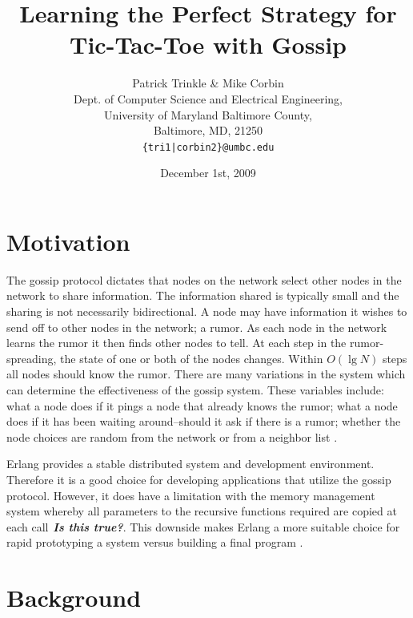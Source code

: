\documentclass[11pt,twocolumn]{article}
\title{Learning the Perfect Strategy for Tic-Tac-Toe with Gossip}
\author{Patrick Trinkle \& Mike Corbin\\
Dept. of Computer Science and Electrical Engineering,\\
University of Maryland Baltimore County,\\
Baltimore, MD, 21250\\
\texttt{\{tri1|corbin2\}@umbc.edu}}
\date{December 1st, 2009}
\begin{document}

\section{Motivation}

The gossip protocol dictates that nodes on the network select other nodes in the network to share information.  The information shared is typically small and the sharing is not necessarily bidirectional.  A node may have information it wishes to send off to other nodes in the network; a rumor.  As each node in the network learns the rumor it then finds other nodes to tell.  At each step in the rumor-spreading, the state of one or both of the nodes changes.  Within $O(\lg N)$ steps all nodes should know the rumor.  There are many variations in the system which can determine the effectiveness of the gossip system.  These variables include: what a node does if it pings a node that already knows the rumor; what a node does if it has been waiting around--should it ask if there is a rumor; whether the node choices are random from the network or from a neighbor list \cite{Birm2007}.

Erlang provides a stable distributed system and development environment.  Therefore it is a good choice for developing applications that utilize the gossip protocol.  However, it does have a limitation with the memory management system whereby all parameters to the recursive functions required are copied at each call{\bf \em{ Is this true?}}.  This downside makes Erlang a more suitable choice for rapid prototyping a system versus building a final program \cite{Erlang}.

\section{Background}
\end{document}
